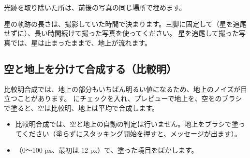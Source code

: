 光跡を取り除いた所は、前後の写真の同じ場所で埋めます。

\begin{memo}[星の軌跡を長くするには]
星の軌跡の長さは、撮影していた時間で決まります。三脚に固定して（星を追尾せずに）、長い時間続けて撮った写真を使ってください。
星を追尾して撮った写真では、星は止まったままで、地上が流れます。
\end{memo}

\subsection{空と地上を分けて合成する（比較明）}

比較明合成では、地上の部分もいちばん明るい値になるため、地上のノイズが目立つことがあります。
にチェックを入れ、プレビューで地上を、空をのブラシで塗ると、空は比較明、地上は平均で合成します。
\begin{itemize}[itemsep=0.3ex]
  \item 比較明合成では、空と地上の自動の判定は行いません。地上をブラシで塗ってください（塗らずにスタッキング開始を押すと、メッセージが出ます）。
  \item {}（0〜100 px、最初は 12 px）で、塗った境目をぼかします。
\end{itemize}
